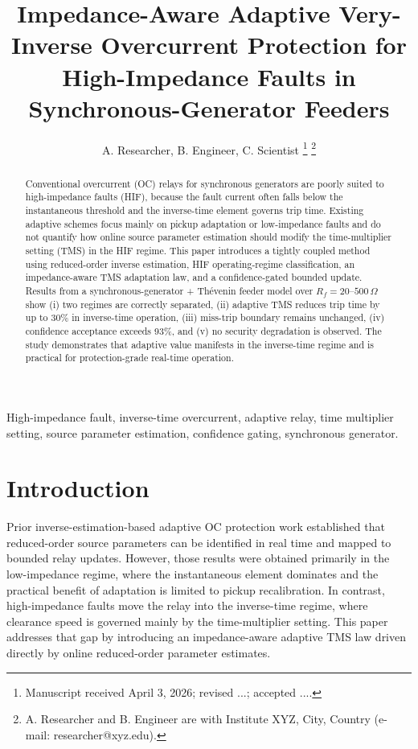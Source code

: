 \documentclass[10pt,journal,compsoc]{IEEEtran}
\title{Impedance-Aware Adaptive Very-Inverse Overcurrent Protection for High-Impedance Faults in Synchronous-Generator Feeders}
\author{A. Researcher, B. Engineer, C. Scientist%
\thanks{Manuscript received April 3, 2026; revised ...; accepted ....}
\thanks{A. Researcher and B. Engineer are with Institute XYZ, City, Country (e-mail: researcher@xyz.edu).}
}
\begin{document}
\maketitle
\begin{abstract}
Conventional overcurrent (OC) relays for synchronous generators are poorly suited to high-impedance faults (HIF), because the fault current often falls below the instantaneous threshold and the inverse-time element governs trip time. Existing adaptive schemes focus mainly on pickup adaptation or low-impedance faults and do not quantify how online source parameter estimation should modify the time-multiplier setting (TMS) in the HIF regime. This paper introduces a tightly coupled method using reduced-order inverse estimation, HIF operating-regime classification, an impedance-aware TMS adaptation law, and a confidence-gated bounded update. Results from a synchronous-generator + Thévenin feeder model over $R_f=20$--$500\,\Omega$ show (i) two regimes are correctly separated, (ii) adaptive TMS reduces trip time by up to 30\% in inverse-time operation, (iii) miss-trip boundary remains unchanged, (iv) confidence acceptance exceeds 93\%, and (v) no security degradation is observed. The study demonstrates that adaptive value manifests in the inverse-time regime and is practical for protection-grade real-time operation.
\end{abstract}
\begin{IEEEkeywords}
High-impedance fault, inverse-time overcurrent, adaptive relay, time multiplier setting, source parameter estimation, confidence gating, synchronous generator.
\end{IEEEkeywords}

\section{Introduction}
Prior inverse-estimation-based adaptive OC protection work established that reduced-order source parameters can be identified in real time and mapped to bounded relay updates. However, those results were obtained primarily in the low-impedance regime, where the instantaneous element dominates and the practical benefit of adaptation is limited to pickup recalibration. In contrast, high-impedance faults move the relay into the inverse-time regime, where clearance speed is governed mainly by the time-multiplier setting. This paper addresses that gap by introducing an impedance-aware adaptive TMS law driven directly by online reduced-order parameter estimates.
\end{document}
